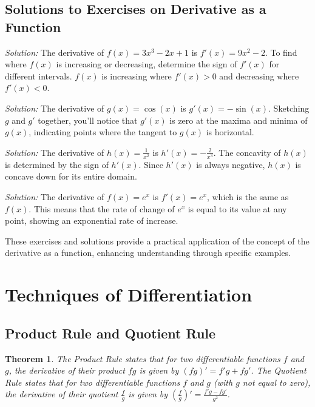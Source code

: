 \documentclass[a4paper,12pt]{book}
\newenvironment{solution}[1][]
{\par\noindent\textit{Solution:} \rmfamily}{\medskip}
\newcounter{example}
\newtheorem{theorem}{Theorem}
\begin{document}
\subsection{Solutions to Exercises on Derivative as a Function}

\begin{solution}[to Exercise 1]
The derivative of \( f(x) = 3x^3 - 2x + 1 \) is \( f'(x) = 9x^2 - 2 \). 
To find where \( f(x) \) is increasing or decreasing, determine the sign of \( f'(x) \) for different intervals. \( f(x) \) is increasing where \( f'(x) > 0 \) and decreasing where \( f'(x) < 0 \).
\end{solution}

\begin{solution}[to Exercise 2]
The derivative of \( g(x) = \cos(x) \) is \( g'(x) = -\sin(x) \). Sketching \( g \) and \( g' \) together, you'll notice that \( g'(x) \) is zero at the maxima and minima of \( g(x) \), indicating points where the tangent to \( g(x) \) is horizontal.
\end{solution}

\begin{solution}[to Exercise 3]
The derivative of \( h(x) = \frac{1}{x^2} \) is \( h'(x) = -\frac{2}{x^3} \). The concavity of \( h(x) \) is determined by the sign of \( h'(x) \). Since \( h'(x) \) is always negative, \( h(x) \) is concave down for its entire domain.
\end{solution}

\begin{solution}[to Exercise 4]
The derivative of \( f(x) = e^x \) is \( f'(x) = e^x \), which is the same as \( f(x) \). This means that the rate of change of \( e^x \) is equal to its value at any point, showing an exponential rate of increase.
\end{solution}

These exercises and solutions provide a practical application of the concept of the derivative as a function, enhancing understanding through specific examples.

\section{Techniques of Differentiation}
\subsection{Product Rule and Quotient Rule}
\begin{theorem}
The Product Rule states that for two differentiable functions \( f \) and \( g \), the derivative of their product \( fg \) is given by \( (fg)' = f'g + fg' \). The Quotient Rule states that for two differentiable functions \( f \) and \( g \) (with \( g \) not equal to zero), the derivative of their quotient \( \frac{f}{g} \) is given by \( \left(\frac{f}{g}\right)' = \frac{f'g - fg'}{g^2} \).
\end{theorem}
\end{document}
